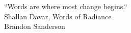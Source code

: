 \documentclass[
	12pt,				%
	openright,			%
	oneside,			%
	a4paper,			%
	hyphens,			%
	english,			%
	english				%
]{abntex2}
\newcommand{\listofcharts}{\listof{chart}{Charts List}}
\begin{document}
    
    \begin{epigrafe}
    \vspace*{\fill}
    \begin{flushright}
    {``Words are where most change begins.``} \\ Shallan Davar, Words of Radiance \\ Brandon Sanderson
    \end{flushright}
    \end{epigrafe}
        
        
	

	\listoffigures*
	\cleardoublepage


	\listoftables*
	\cleardoublepage

	
	
	
    \lstlistoflistings
    \clearpage

	\tableofcontents*
	\cleardoublepage

	\textual

	

	
	
	
	\apendices
	
	


\end{document}
